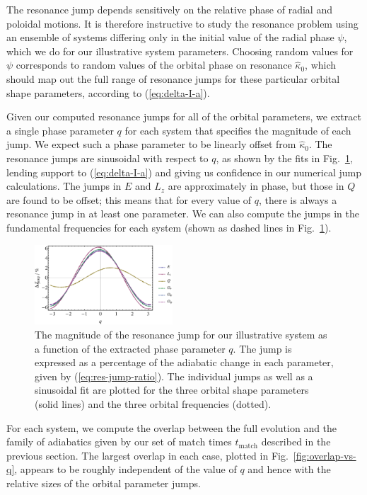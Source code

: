 \documentclass[aps,prd,amsfonts,amssymb,amsmath,nofootinbib,showpacs,superscriptaddress,twocolumn]{revtex4}
\newcommand{\eqnref}[1]{(\ref{eq:#1})}
\newcommand{\figref}[1]{Fig.~\ref{fig:#1}}
\newcommand{\sub}[1]{\ensuremath{_\mathrm{#1}}}
\begin{document}
The resonance jump depends sensitively on the relative phase of radial and poloidal motions. It is therefore instructive to study the resonance problem using an ensemble of systems differing only in the initial value of the radial phase $\psi$, which we do for our illustrative system parameters. Choosing random values for $\psi$ corresponds to random values of the orbital phase on resonance $\widehat{\kappa}_0$, which should map out the full range of resonance jumps for these particular orbital shape parameters, according to \eqnref{delta-I-a}.

Given our computed resonance jumps for all of the orbital parameters, we extract a single phase parameter $q$ for each system that specifies the magnitude of each jump. We expect such a phase parameter to be linearly offset from $\widehat{\kappa}_0$. The resonance jumps are sinusoidal with respect to $q$, as shown by the fits in \figref{resjump-vs-q}, lending support to \eqnref{delta-I-a} and giving us confidence in our numerical jump calculations. The jumps in $E$ and $L_z$ are approximately in phase, but those in $Q$ are found to be offset; this means that for every value of $q$, there is always a resonance jump in at least one parameter. We can also compute the jumps in the fundamental frequencies for each system (shown as dashed lines in \figref{resjump-vs-q}).

\begin{figure}
\centering
\includegraphics[width=0.46\textwidth]{Fig_jump_vs_q}
\caption{\label{fig:resjump-vs-q}The magnitude of the resonance jump for our illustrative system as a function of the extracted phase parameter $q$. The jump is expressed as a percentage of the adiabatic change in each parameter, given by \eqnref{res-jump-ratio}. The individual jumps as well as a sinusoidal fit are plotted for the three orbital shape parameters (solid lines) and the three orbital frequencies (dotted).}
\end{figure}

For each system, we compute the overlap between the full evolution and the family of adiabatics given by our set of match times $t\sub{match}$ described in the previous section. The largest overlap in each case, plotted in \figref{overlap-vs-q}, appears to be roughly independent of the value of $q$ and hence with the relative sizes of the orbital parameter jumps.
\end{document}
